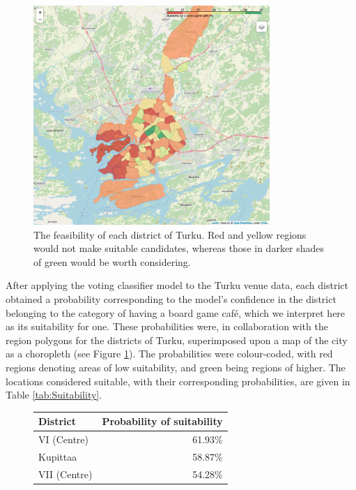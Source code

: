 \documentclass{article}
\begin{document}
    \begin{figure}[h]
        \centering
        \includegraphics[width=0.8\textwidth]{Turku_map.png}
        \caption{\label{fig:Turkuprobs}The feasibility of each district of Turku. 
        Red and yellow regions would not make suitable candidates, whereas those in darker shades of green would be worth considering.}
    \end{figure}

    After applying the voting classifier model to the Turku venue data, each district obtained a probability corresponding to the model's confidence in the district belonging to the category of having a board game caf\'e, which we interpret here as its suitability for one. 
    These probabilities were, in collaboration with the region polygons for the districts of Turku, superimposed upon a map of the city as a choropleth (see Figure \ref{fig:Turkuprobs}).
    The probabilities were colour-coded, with red regions denoting areas of low suitability, and green being regions of higher.
    The locations considered suitable, with their corresponding probabilities, are given in Table \ref{tab:Suitability}. \\

    \begin{figure}[h]
        \centering
        \begin{tabular}{l | r }
            District & Probability of suitability\\
            \hline
            VI (Centre) & 61.93\% \\
            \hline
            Kupittaa & 58.87\% \\
            \hline
            VII (Centre) & 54.28\% \\
        \end{tabular}
    \end{figure}
\end{document}
